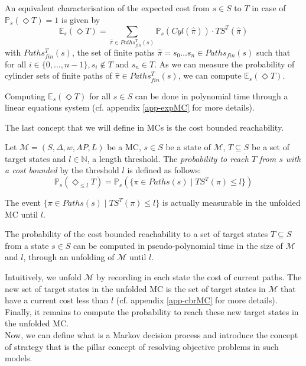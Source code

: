 An equivalent characterisation of the expected cost from $s \in S$ to $T$ in case of $\mathbb{P}_s(\Diamond T) = 1$ is given by
\[
  \mathbb{E}_s(\Diamond T) = \sum_{\hat{\pi} \in Paths_{fin}^T(s)} \mathbb{P}_s(Cyl(\hat{\pi})) \cdot TS^T(\hat{\pi})
\]
with $Paths^T_{fin}(s)$, the set of finite paths $\hat{\pi} = s_0 \dots s_n \in Paths_{fin}(s)$  such that for all $i \in \{0, \dots, n-1\}, s_i \not \in T$ and $s_n \in T$. As we can measure the probability of cylinder sets of finite paths of $\hat{\pi} \in Paths_{fin}^T(s)$, we can compute $\mathbb{E}_s(\Diamond T)$.

\begin{theorem}
  Computing $\mathbb{E}_s(\Diamond T)$ for all $s \in S$ can be done in polynomial time through a linear equations system (cf. appendix \ref{app-expMC} for more details).
\end{theorem}

The last concept that we will define in MCs is the cost bounded reachability.

\begin{definition}
	Let $\mathcal{M} = (S, \Delta, w, AP, L)$ be a MC, $s \in S$ be a state of $\mathcal{M}$, $T \subseteq S$ be a set of target states and $l \in \mathbb{N}$, a length threshold.
  The \textit{probability to reach $T$ from $s$ with a cost bounded} by the threshold $l$ is defined as follows:
	\[
    \mathbb{P}_s(\Diamond_{\leq l} T) = \mathbb{P}_s(\{\pi \in Paths(s) \; | \; TS^T(\pi) \leq l \})
  \]
\end{definition}
The event $\{\pi \in Paths(s) \; | \; TS^T(\pi) \leq l \}$ is actually measurable
in the unfolded MC until $l$.
\begin{theorem}
  The probability of the cost bounded reachability to a set of target states $T \subseteq S$ from a state $s \in S$ can be computed in pseudo-polynomial time in the size of $\mathcal{M}$ and $l$, through an unfolding of $\mathcal{M}$ until $l$.
\end{theorem}

Intuitively, we unfold $\mathcal{M}$ by recording in each state the cost of
current paths. The new set of target states in the unfolded MC is the set of
target states in $\mathcal{M}$ that have a current cost less than $l$ (cf.
appendix \ref{app-cbrMC} for more details). Finally, it remains to compute the probability to
reach these new target states in the unfolded MC. \\

Now, we can define what is a Markov decision process and introduce the concept of strategy that is the pillar concept of resolving objective problems in such models.

